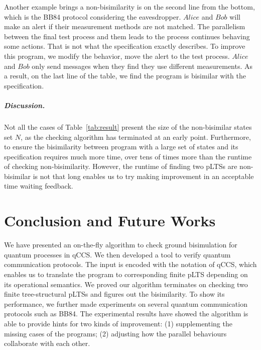 \documentclass[a4paper,UKenglish,cleveref, autoref]{lipics-v2019}
\begin{document}

Another example brings a non-bisimilarity is on the second line from the bottom, which is the BB84 protocol considering the eavesdropper. $Alice$ and $Bob$ will make an alert if their measurement methods are not matched. The parallelism between the final test process and them leads to the process continues behaving some actions. That is not what the specification exactly describes. To improve this program, we modify the behavior, move the alert to the test process. $Alice$ and $Bob$ only send messages when they find they use different measurements. As a result, on the last line of the table, we find the program is bisimilar with the specification.
\subparagraph*{Discussion.} Not all the cases of Table~\ref{tab:result} present the size of the non-bisimilar states set $N$, as the checking algorithm has terminated at an early point. Furthermore, to ensure the bisimilarity between program with a large set of states and its specification requires much more time, over tens of times more than the runtime of checking non-bisimilarity. However, the runtime of finding two pLTSs are non-bisimilar is not that long enables us to try making improvement in an acceptable time waiting feedback.

\section{Conclusion and Future Works}\label{sec:con}
We have presented an on-the-fly algorithm to check ground bisimulation for quantum processes in qCCS. 
We then developed a tool to verify quantum communication protocols. The input is encoded with the notation of qCCS, which enables us to translate the program to corresponding finite pLTS depending on its operational semantics. We proved our algorithm terminates on checking two finite tree-structural pLTSs and figures out the bisimilarity. To show its performance, we further made experiments on several quantum communication protocols such as BB84. The experimental results have showed the algorithm is able to provide hints for two kinds of improvement: (1) supplementing the missing cases of the programs; (2) adjusting how the parallel behaviours collaborate with each other.
\end{document}
